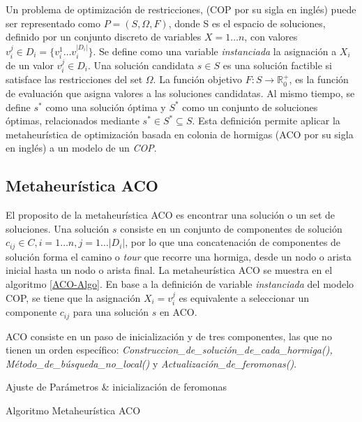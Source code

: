 Un problema de optimización de restricciones, (COP por su sigla en ingl\'es) puede ser representado como $P = (S, \Omega, F)$, donde S es el espacio de soluciones, definido por un conjunto discreto de variables $X = 1 \dotsc n$, con valores $v_{i}^{j} \in D_{i} = \{v_{i}^{1} \dotsc  v_{i}^{|D_{i}|}\}$. Se define como una variable {\it instanciada} la asignaci\'on a $X_i$ de un valor $v_{i}^{j} \in D_i$. Una solución candidata $s \in S$ es una soluci\'on factible si satisface las restricciones del set $\Omega$. La funci\'on objetivo $F: S\rightarrow \mathbb R_{0}^{+}$, es la funci\'on de evaluaci\'on que asigna valores a las soluciones candidatas. Al mismo tiempo, se define $s^{*}$ como una soluci\'on \'optima y $S^{*}$ como un conjunto de soluciones \'optimas, relacionados mediante $s^{*} \in S^{*} \subseteq S $\cite{socha2008ant}.
Esta definici\'on permite aplicar la metaheur\'istica de optimizaci\'on basada en colonia de hormigas (ACO por su sigla en ingl\'es) a un modelo de un {\it COP}.

\subsection{Metaheur\'istica ACO}
El proposito de la metaheur\'istica ACO es encontrar una soluci\'on o un set de soluciones. Una soluci\'on $s$ consiste en un conjunto de componentes de soluci\'on $c_{ij} \in C, i = 1 \dotsc n, j = 1 \dotsc |D_i|$, por lo que una concatenaci\'on de componentes de soluci\'on forma el camino o {\it tour} que recorre una hormiga, desde un nodo o arista inicial hasta un nodo o arista final. La metaheur\'istica ACO se muestra en el algoritmo \ref{ACO-Algo}. En base a la definici\'on de variable {\it instanciada} del modelo COP, se tiene que la asignaci\'on $X_i = v_{i}^{j}$ es equivalente a seleccionar un componente $c_{ij}$ para una soluci\'on $s$ en ACO.

ACO consiste en un paso de inicializaci\'on y de tres componentes, las que no tienen un orden espec\'ifico: {\it Construccion\_de\_soluci\'on\_de\_cada\_hormiga(),  M\'etodo\_de\_b\'usqueda\_no\_local()} y {\it Actualizaci\'on\_de\_feromonas()}.


\begin{algorithm}[H]
\SetAlgoLined
{}
 Ajuste de Par\'ametros \& inicializaci\'on de feromonas \;
 \caption{Algoritmo Metaheur\'istica ACO}\label{ACO-Algo}
\end{algorithm}


